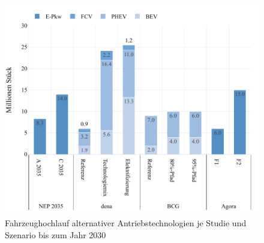 \begin{figure}[H]
    \centering
    \includegraphics[width=\textwidth]{Bilder/RampUp-2030-Focus-MA}
    \caption{Fahrzeughochlauf alternativer Antriebstechnologien je Studie und Szenario bis zum Jahr \num{2030}}\label{fig:RampUp2030}
\end{figure}